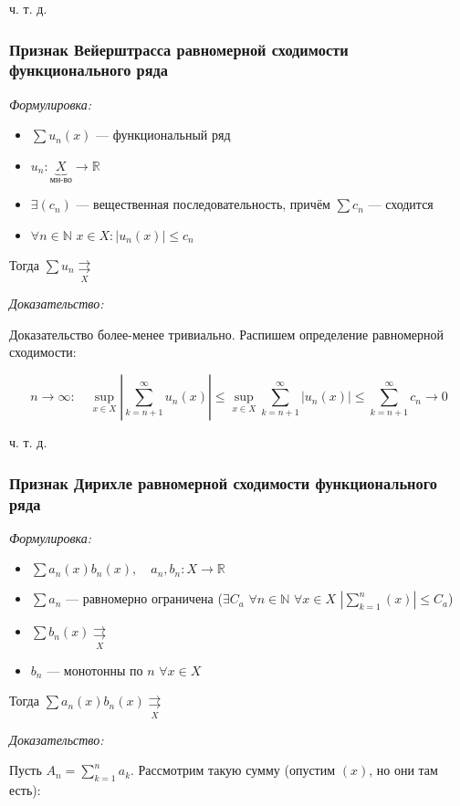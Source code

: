 \documentclass{article}
\def\dbl{\,\,}
\def\rsh#1{\underset{#1}{\rightrightarrows}}
\begin{document}
ч. т. д.

\subsubsection{Признак Вейерштрасса равномерной сходимости функционального ряда}
\textit{Формулировка:}

\begin{itemize}
    \item $\sum u_n(x)$ --- функциональный ряд
    \item $u_n: \underbrace{X}_{\text{мн-во}} \rightarrow \mathbb{R}$
    \item $\exists (c_n)$ --- вещественная последовательность, причём $\sum c_n$ --- сходится
    \item $\forall n \in \mathbb{N} \dbl x \in X: |u_n(x)| \le c_n$
\end{itemize}

Тогда $\sum u_n \rsh{X}$

\textit{Доказательство:}

Доказательство более-менее тривиально. Распишем определение равномерной сходимости:

\[n \rightarrow \infty: \quad \sup_{x \in X} \left| \sum_{k = n + 1}^{\infty} u_n(x) \right| \le \sup_{x \in X} \sum_{k = n + 1}^{\infty} \left| u_n(x) \right| \le \sum_{k = n + 1}^{\infty} c_n \longrightarrow 0\]

ч. т. д.

\subsubsection{Признак Дирихле равномерной сходимости функционального ряда}
\textit{Формулировка:}

\begin{itemize}
    \item $\sum a_n(x) b_n(x), \quad a_n, b_n: X \rightarrow \mathbb{R}$
    \item $\sum a_n$ --- равномерно ограничена ($\exists C_a \dbl \forall n \in \mathbb{N} \dbl \forall x \in X \dbl \left|\sum_{k = 1}^{n}(x)\right| \le C_a$)
    \item $\sum b_n(x) \rsh{X}$
    \item $b_n$ --- монотонны по $n \dbl \forall x \in X$
\end{itemize}

Тогда $\sum a_n(x) b_n(x) \rsh{X}$

\textit{Доказательство:}

Пусть $A_n = \sum_{k = 1}^n a_k$. Рассмотрим такую сумму (опустим $(x)$, но они там есть): 
\end{document}
